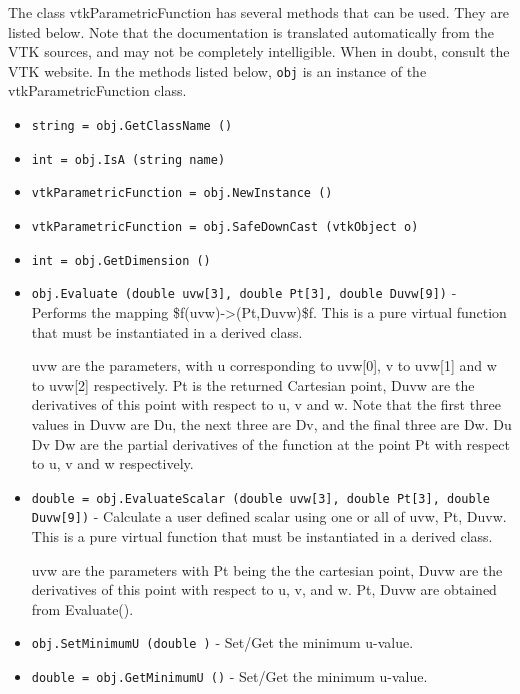 The class vtkParametricFunction has several methods that can be used.
  They are listed below.
Note that the documentation is translated automatically from the VTK sources,
and may not be completely intelligible.  When in doubt, consult the VTK website.
In the methods listed below, \verb|obj| is an instance of the vtkParametricFunction class.
\begin{itemize}
\item  \verb|string = obj.GetClassName ()|

\item  \verb|int = obj.IsA (string name)|

\item  \verb|vtkParametricFunction = obj.NewInstance ()|

\item  \verb|vtkParametricFunction = obj.SafeDownCast (vtkObject o)|

\item  \verb|int = obj.GetDimension ()|

\item  \verb|obj.Evaluate (double uvw[3], double Pt[3], double Duvw[9])| -  Performs the mapping \$f(uvw)->(Pt,Duvw)\$f.
 This is a pure virtual function that must be instantiated in 
 a derived class. 

 uvw are the parameters, with u corresponding to uvw[0],
 v to uvw[1] and w to uvw[2] respectively. Pt is the returned Cartesian point, 
 Duvw are the derivatives of this point with respect to u, v and w.  
 Note that the first three values in Duvw are Du, the next three are Dv, 
 and the final three are Dw. Du Dv Dw are the partial derivatives of the 
 function at the point Pt with respect to u, v and w respectively.

\item  \verb|double = obj.EvaluateScalar (double uvw[3], double Pt[3], double Duvw[9])| -  Calculate a user defined scalar using one or all of uvw, Pt, Duvw.
 This is a pure virtual function that must be instantiated in 
 a derived class. 

 uvw are the parameters with Pt being the the cartesian point, 
 Duvw are the derivatives of this point with respect to u, v, and w.
 Pt, Duvw are obtained from Evaluate().

\item  \verb|obj.SetMinimumU (double )| -  Set/Get the minimum u-value.

\item  \verb|double = obj.GetMinimumU ()| -  Set/Get the minimum u-value.


\end{itemize}
